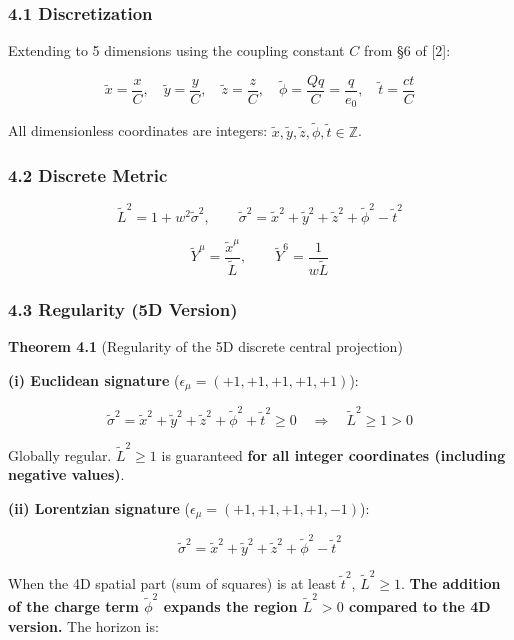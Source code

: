 \documentclass[a4paper,11pt]{article}
\theoremstyle{definition}
\begin{document}
\subsubsection{4.1 Discretization}\label{discretization}

Extending to 5 dimensions using the coupling constant \(C\) from §6 of {[}2{]}:

\[\tilde{x} = \frac{x}{C}, \quad \tilde{y} = \frac{y}{C}, \quad \tilde{z} = \frac{z}{C}, \quad \tilde{\phi} = \frac{Qq}{C} = \frac{q}{e_0}, \quad \tilde{t} = \frac{ct}{C} \tag{4.1}\]

All dimensionless coordinates are integers: \(\tilde{x}, \tilde{y}, \tilde{z}, \tilde{\phi}, \tilde{t} \in \mathbb{Z}\).

\subsubsection{4.2 Discrete Metric}\label{discrete-metric}

\[\tilde{L}^2 = 1 + w^2 \tilde{\sigma}^2, \qquad \tilde{\sigma}^2 = \tilde{x}^2 + \tilde{y}^2 + \tilde{z}^2 + \tilde{\phi}^2 - \tilde{t}^2 \tag{4.2}\]

\[\tilde{Y}^\mu = \frac{\tilde{x}^\mu}{\tilde{L}}, \qquad \tilde{Y}^6 = \frac{1}{w\tilde{L}} \tag{4.3}\]

\subsubsection{4.3 Regularity (5D Version)}\label{regularity-5d-version}

\textbf{Theorem 4.1} (Regularity of the 5D discrete central projection)

\textbf{(i) Euclidean signature} (\(\epsilon_\mu = (+1,+1,+1,+1,+1)\)):

\[\tilde{\sigma}^2 = \tilde{x}^2 + \tilde{y}^2 + \tilde{z}^2 + \tilde{\phi}^2 + \tilde{t}^2 \geq 0 \quad \Longrightarrow \quad \tilde{L}^2 \geq 1 > 0 \tag{4.4}\]

Globally regular. \(\tilde{L}^2 \geq 1\) is guaranteed \textbf{for all integer coordinates (including negative values)}.

\textbf{(ii) Lorentzian signature} (\(\epsilon_\mu = (+1,+1,+1,+1,-1)\)):

\[\tilde{\sigma}^2 = \tilde{x}^2 + \tilde{y}^2 + \tilde{z}^2 + \tilde{\phi}^2 - \tilde{t}^2 \tag{4.5}\]

When the 4D spatial part (sum of squares) is at least \(\tilde{t}^2\), \(\tilde{L}^2 \geq 1\). \textbf{The addition of the charge term \(\tilde{\phi}^2\) expands the region \(\tilde{L}^2 > 0\) compared to the 4D version.} The horizon is:
\end{document}
